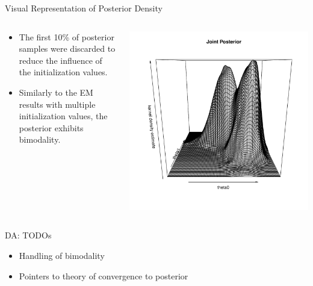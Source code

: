 \documentclass[dvipdfmx,bigger,aspectratio=169]{beamer}
\begin{document}
\begin{frame}[label={sec:org7a37a13}]{Visual Representation of Posterior Density}
\begin{columns}
\begin{column}{0.50\columnwidth}
\begin{itemize}
\item The first 10\% of posterior samples were discarded to reduce the influence of the initialization values.
\item Similarly to the EM results with multiple initialization values, the posterior exhibits bimodality.
\end{itemize}
\end{column}

\begin{column}{0.50\columnwidth}
\scriptsize
\begin{center}
\includegraphics[page=1,keepaspectratio,width=\textwidth]{./source/ip_figure3.pdf}
\end{center}
\normalsize
\end{column}
\end{columns}
\end{frame}

\begin{frame}[label={sec:org9829f05}]{DA: TODOs}
\begin{itemize}
\item Handling of bimodality
\item Pointers to theory of convergence to posterior
\end{itemize}
\end{frame}
\end{document}
